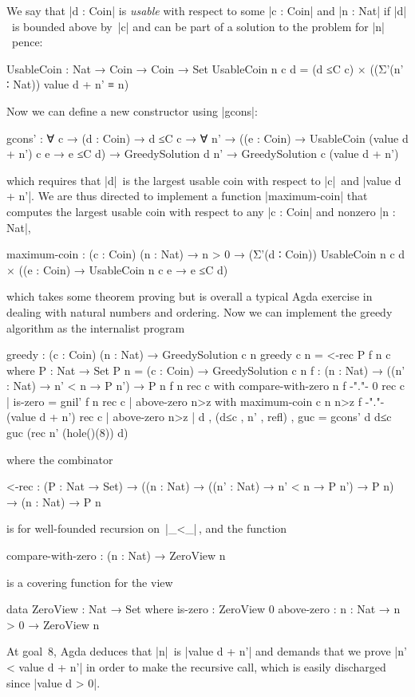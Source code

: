 We say that |d : Coin| is \emph{usable} with respect to some |c : Coin| and |n : Nat| if |d|~is bounded above by~|c| and can be part of a solution to the problem for |n|~pence:
\begin{code}
UsableCoin : Nat → Coin → Coin → Set
UsableCoin n c d =
  (d ≤C c) × ((Σ'(n' ∶ Nat)) value d + n' ≡ n)
\end{code}
Now we can define a new constructor using |gcons|:
\begin{code}
gcons' :
  ∀ {c} → (d : Coin) → d ≤C c →
  ∀ {n'} →
  ((e : Coin) → UsableCoin (value d + n') c e → e ≤C d) →
  GreedySolution d n' → GreedySolution c (value d + n')
\end{code}
which requires that |d|~is the largest usable coin with respect to |c|~and |value d + n'|.
We are thus directed to implement a function |maximum-coin| that computes the largest usable coin with respect to any |c : Coin| and nonzero |n : Nat|,
\begin{code}maximum-coin :
  (c : Coin) (n : Nat) → n > 0 →
  (Σ'(d ∶ Coin))  UsableCoin n c d ×
                 ((e : Coin) → UsableCoin n c e → e ≤C d)
\end{code}which takes some theorem proving but is overall a typical Agda exercise in dealing with natural numbers and ordering.
Now we can implement the greedy algorithm as the internalist program
\begin{code}
greedy : (c : Coin) (n : Nat) → GreedySolution c n
greedy c n = <-rec P f n c
  where
    P : Nat → Set
    P n = (c : Coin) → GreedySolution c n
    f : (n : Nat) → ((n' : Nat) → n' < n → P n') → P n
    f          n               rec  c  with compare-with-zero n 
    f {-"."-}  0               rec  c  | is-zero = gnil'
    f          n               rec  c  | above-zero n>z
                                       with maximum-coin c n n>z
    f {-"."-}  (value d + n')  rec  c  | above-zero n>z
                                       | d , (d≤c , n' , refl) , guc =
                                         gcons' d d≤c guc (rec n' (hole()(8)) d)
\end{code}
where the combinator
\begin{code}<-rec :  (P : Nat → Set) →
         ((n : Nat) → ((n' : Nat) → n' < n → P n') → P n) →
         (n : Nat) → P n
\end{code}is for well-founded recursion on~|_<_|\,, and the function
\begin{code}compare-with-zero : (n : Nat) → ZeroView n
\end{code}is a covering function for the view
\begin{code}
data ZeroView : Nat → Set where
  is-zero     :  ZeroView 0
  above-zero  :  {n : Nat} → n > 0 → ZeroView n
\end{code}
At goal~8, Agda deduces that |n|~is |value d + n'| and demands that we prove |n' < value d + n'| in order to make the recursive call, which is easily discharged since |value d > 0|.

